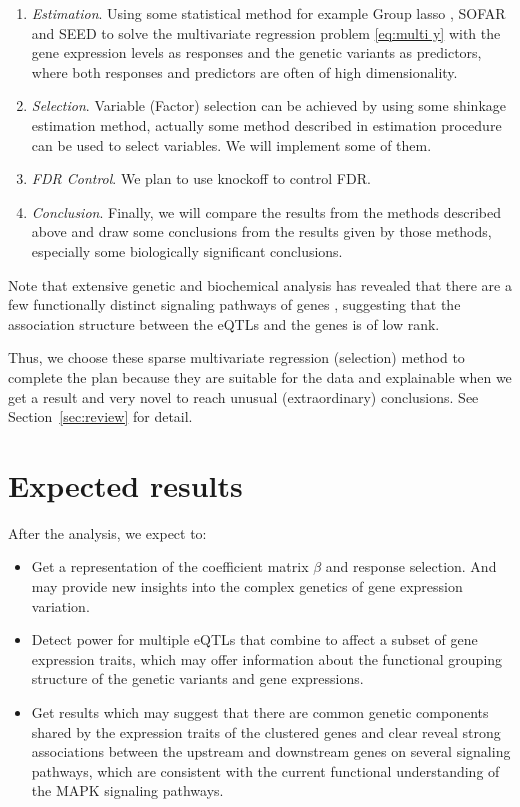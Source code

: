 \begin{enumerate}
    \renewcommand{\labelenumi}{(\theenumi)}
    \item \emph{Estimation}.    Using some statistical method for example Group lasso \citep{yuan2006model}, SOFAR \citep{uematsu2019sofar} and SEED \citep{zheng2019scalable} to solve the multivariate regression problem \eqref{eq:multi y} with the gene expression levels as responses and the genetic variants as predictors, where both responses and predictors are often of high dimensionality. 
    \item \emph{Selection}.     Variable (Factor) selection can be achieved by using some shinkage estimation method, actually some method described in estimation procedure can be used to select variables. We will implement some of them. 
    \item \emph{FDR Control}.   We plan to use knockoff \citet{barber2015knockoffs,dai2016knockoff,candes2018panning} to control FDR. 
    \item \emph{Conclusion}.    Finally, we will compare the results from the methods described above and draw some conclusions from the results given by those methods, especially some biologically significant conclusions. 
\end{enumerate}

Note that extensive genetic and biochemical analysis has revealed that there are a few functionally distinct signaling pathways of genes \citep{brem2005landscape,gustin1998map}, suggesting that the association structure between the eQTLs and the genes is of low rank. 

Thus, we choose these sparse multivariate regression (selection) method to complete the plan because they are suitable for the data and explainable when we get a result and very novel to reach unusual (extraordinary) conclusions. 
See Section~\ref{sec:review} for detail. 


\section{Expected results}

After the analysis, we expect to:

\begin{itemize}
    \item Get a representation of the coefficient matrix $\beta$ and response selection. And may provide new insights into the complex genetics of gene expression variation. 
    \item Detect power for multiple eQTLs that combine to affect a subset of gene expression traits, which may offer information about the functional grouping structure of the genetic variants and gene expressions. 
    \item Get results which may suggest that there are common genetic components shared by the expression traits of the clustered genes and clear reveal strong associations between the upstream and downstream genes on several signaling pathways, which are consistent with the current functional understanding of the MAPK signaling pathways. 
\end{itemize}



